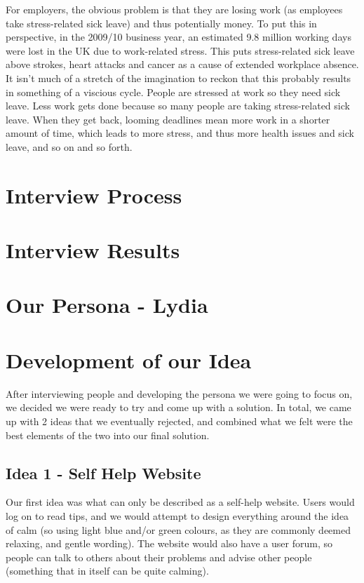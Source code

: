 \documentclass{scrartcl}
\begin{document}
For employers, the obvious problem is that they are losing work (as employees take stress-related sick leave) and thus
potentially money. To put this in perspective, in the 2009/10 business year, an estimated 9.8 million working days
were lost in the UK due to work-related stress. This puts stress-related sick leave above strokes, heart attacks and
cancer as a cause of extended workplace absence. It isn't much of a stretch of the imagination to reckon that this
probably results in something of a viscious cycle. People are stressed at work so they need sick leave. Less work gets
done because so many people are taking stress-related sick leave. When they get back, looming deadlines mean more work
in a shorter amount of time, which leads to more stress, and thus more health issues and sick leave, and so on and so forth.

\section{Interview Process}

\section{Interview Results}

\section{Our Persona - Lydia}

\section{Development of our Idea}
After interviewing people and developing the persona we were going to focus on, we decided we were ready to try and come up with
a solution. In total, we came up with 2 ideas that we eventually rejected, and combined what we felt were the best elements
of the two into our final solution.

\subsection{Idea 1 - Self Help Website}
Our first idea was what can only be described as a self-help website. Users would log on to read tips, and we would attempt to
design everything around the idea of calm (so using light blue and/or green colours, as they are commonly deemed relaxing,
and gentle wording). The website would also have a user forum, so people can talk to others about their problems and advise
other people (something that in itself can be quite calming).
\end{document}
